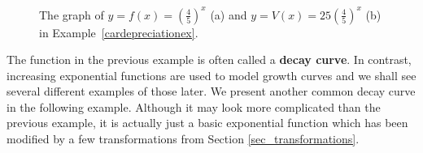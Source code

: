 \begin{example}
\begin{enumerate}
\end{enumerate}

\begin{figure}[H]
\centering
\centerline{
\hspace{1cm}
}	
\caption{The graph of $y=f(x)=\left(\frac{4}{5}\right)^{x}$ (a) and $y=V(x)=25\left(\frac{4}{5}\right)^{x}$ (b) in Example~\ref{cardepreciationex}.}
\end{figure}


\end{example}

\ifcourse

The function in the previous example is often called a \textbf{decay curve}.  In contrast, increasing exponential functions are used to model growth curves and we shall see several different examples of those later. We present another common decay curve in the following example.  Although it may look more complicated than the previous example, it is actually just a basic exponential function which has been modified by a few transformations from Section \ref{sec_transformations}.

